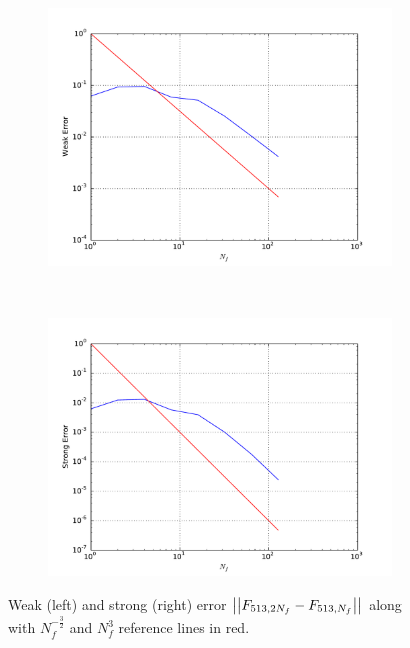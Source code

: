 \documentclass[11pt]{amsart}
\begin{document}
\begin{figure}
    \centering
    \begin{subfigure}[b]{0.4\textwidth}
        \includegraphics[width=\textwidth]{weakerr1.pdf}
    \end{subfigure}
    ~ %
    \begin{subfigure}[b]{0.4\textwidth}
        \includegraphics[width=\textwidth]{strongerr1.pdf}
    \end{subfigure}
    \caption{\label{fig:rateFig1} Weak (left) and strong (right) error
    $\left| {\left| {{F_{513,2N_f} - F_{513,N_f}}} \right|} \right|_{}$ along with $N_f^{-\frac{3}{2}}$ and
    	$N_f^{3}$ reference lines in red.}
\end{figure}
\end{document}

